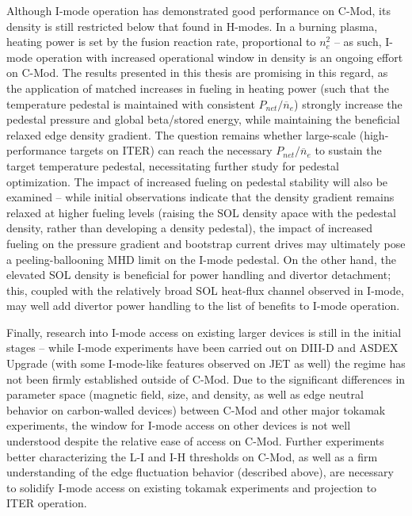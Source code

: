 Although I-mode operation has demonstrated good performance on C-Mod, its density is still restricted below that found in H-modes.  In a burning plasma, heating power is set by the fusion reaction rate, proportional to $n_e^2$ -- as such, I-mode operation with increased operational window in density is an ongoing effort on C-Mod.  The results presented in this thesis are promising in this regard, as the application of matched increases in fueling in heating power (such that the temperature pedestal is maintained with consistent $P_{net}/\overline{n}_e$) strongly increase the pedestal pressure and global beta/stored energy, while maintaining the beneficial relaxed edge density gradient.  The question remains whether large-scale (\eg high-performance targets on ITER) can reach the necessary $P_{net}/\overline{n}_e$ to sustain the target temperature pedestal, necessitating further study for pedestal optimization.  The impact of increased fueling on pedestal stability will also be examined -- while initial observations indicate that the density gradient remains relaxed at higher fueling levels (raising the SOL density apace with the pedestal density, rather than developing a density pedestal), the impact of increased fueling on the pressure gradient and bootstrap current drives may ultimately pose a peeling-ballooning MHD limit on the I-mode pedestal.  On the other hand, the elevated SOL density is beneficial for power handling and divertor detachment; this, coupled with the relatively broad SOL heat-flux channel observed in I-mode, may well add divertor power handling to the list of benefits to I-mode operation.

Finally, research into I-mode access on existing larger devices is still in the initial stages -- while I-mode experiments have been carried out on DIII-D and ASDEX Upgrade (with some I-mode-like features observed on JET as well) the regime has not been firmly established outside of C-Mod.  Due to the significant differences in parameter space (magnetic field, size, and density, as well as edge neutral behavior on carbon-walled devices) between C-Mod and other major tokamak experiments, the window for I-mode access on other devices is not well understood despite the relative ease of access on C-Mod.  Further experiments better characterizing the L-I and I-H thresholds on C-Mod, as well as a firm understanding of the edge fluctuation behavior (described above), are necessary to solidify I-mode access on existing tokamak experiments and projection to ITER operation.\nicechapterending


